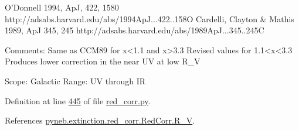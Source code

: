\begin{DoxyVerb}
\begin{DoxyVerb}
O'Donnell 1994, ApJ, 422, 1580
http://adsabs.harvard.edu/abs/1994ApJ...422..158O
Cardelli, Clayton & Mathis 1989, ApJ 345, 245
http://adsabs.harvard.edu/abs/1989ApJ...345..245C

Comments:
Same as CCM89 for x<1.1 and x>3.3
Revised values for 1.1<x<3.3
Produces lower correction in the near UV at low R_V

Scope: Galactic
Range: UV through IR\end{DoxyVerb}
 

Definition at line \hyperlink{red__corr_8py_source_l00445}{445} of file \hyperlink{red__corr_8py_source}{red\-\_\-corr.\-py}.



References \hyperlink{red__corr_8py_source_l00204}{pyneb.\-extinction.\-red\-\_\-corr.\-Red\-Corr.\-R\-\_\-\-V}.



\end{DoxyVerb}
